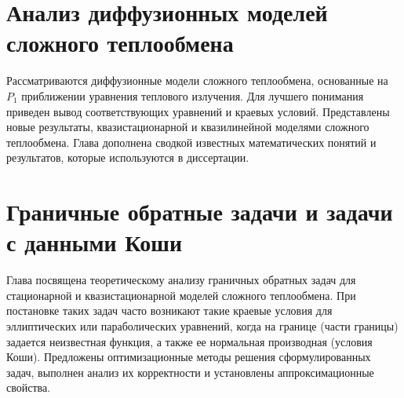 \documentclass[a4paper,14pt,oneside,openany]{memoir}
\begin{document}
    \gappto\captionsrussian{\unskip} %
    



    \chapter{Анализ диффузионных моделей сложного теплообмена}\label{ch:ch1}
    Рассматриваются диффузионные модели сложного теплообмена, основанные
    на $P_1$ приближении уравнения теплового излучения.
    Для лучшего понимания приведен вывод соответствующих уравнений и краевых условий.
    Представлены новые результаты, квазистационарной и квазилинейной моделями сложного теплообмена.
    Глава дополнена сводкой известных математических понятий и результатов,
    которые используются в диссертации.
    
    
    
    
    
    


    \chapter{Граничные обратные задачи и задачи с данными Коши}\label{ch:ch2}
    Глава посвящена теоретическому анализу граничных обратных задач для
    стационарной и квазистационарной моделей сложного теплообмена.
    При постановке таких задач часто возникают такие краевые условия для
    эллиптических или параболических уравнений, когда на границе (части
    границы) задается неизвестная функция, а также ее нормальная производная
    (условия Коши).
    Предложены оптимизационные методы решения
    сформулированных задач, выполнен анализ их корректности и установлены
    аппроксимационные свойства.
    
    
    
    
\end{document}
